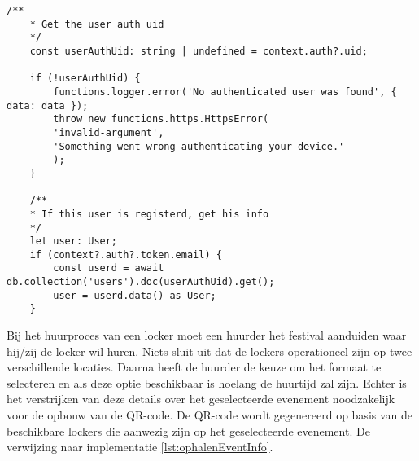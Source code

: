 \begin{lstlisting}[caption={Ophalen de zopas aangemaakte gebruiker zijn gegevens indien hij in het huur proces terecht gekomen is.}, label={lst:ophalenUser}]
    /**
    * Get the user auth uid
    */
    const userAuthUid: string | undefined = context.auth?.uid;
    
    if (!userAuthUid) {
        functions.logger.error('No authenticated user was found', { data: data });
        throw new functions.https.HttpsError(
        'invalid-argument',
        'Something went wrong authenticating your device.'
        );
    }
    
    /**
    * If this user is registerd, get his info
    */
    let user: User;
    if (context?.auth?.token.email) {
        const userd = await db.collection('users').doc(userAuthUid).get();
        user = userd.data() as User;
    }
\end{lstlisting}

Bij het huurproces van een locker moet een huurder het festival aanduiden waar hij/zij de locker wil huren. Niets sluit uit dat de lockers operationeel zijn op twee verschillende locaties. Daarna heeft de huurder de keuze om het formaat te selecteren en als deze optie beschikbaar is hoelang de huurtijd zal zijn. Echter is het verstrijken van deze details over het geselecteerde evenement noodzakelijk voor de opbouw van de QR-code. De QR-code wordt gegenereerd op basis van de beschikbare lockers die aanwezig zijn op het geselecteerde evenement. De verwijzing naar  implementatie \ref{lst:ophalenEventInfo}.


